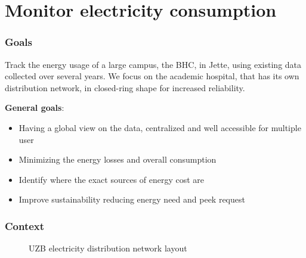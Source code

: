 \section{Monitor electricity consumption}
\SectionPage

\begin{frame}
    \frametitle{Goals}
    \vspace*{\fill}
    Track the energy usage of a large campus, the \ac{BHC}, in Jette, using existing data collected over several years.
    We focus on the academic hospital, that has its own distribution network, in closed-ring shape for increased reliability.

    \textbf{General goals}:
    \begin{itemize}
        \item Having a global view on the data, centralized and well accessible for multiple user
        \item Minimizing the energy losses and overall consumption
        \item Identify where the exact sources of energy cost are
        \item Improve sustainability reducing energy need and peek request
    \end{itemize}

    \vspace*{\fill}
\end{frame}

\begin{frame}
    \frametitle{Context}
    \begin{figure}[ht]
        \caption{\acs{UZB} electricity distribution network layout}
        \label{fig:bhc_site_layout}
    \end{figure}
\end{frame}

